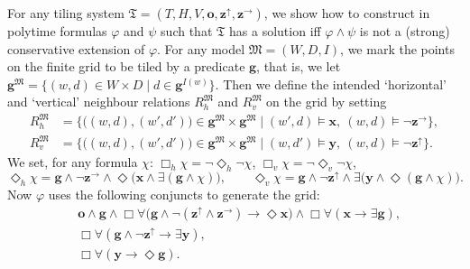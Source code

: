 \documentclass{lmcs} %
\theoremstyle{plain}\newtheorem{satz}[thm]{Satz} %
\newcommand{\tiling}{\mathfrak T}
\newcommand{\bbvarup}{\Zvar^\uparrow}
\newcommand{\bbvarright}{\Zvar^\to}
\newcommand{\Dht}[1]{\Diamond_h{#1}}
\newcommand{\Dvt}[1]{\Diamond_v{#1}}
\newcommand{\Bht}[1]{\Box_h{#1}}
\newcommand{\Bvt}[1]{\Box_v{#1}}
\newcommand{\fform}[1]{\boldsymbol{#1}}
\newcommand{\gvar}{\fform{g}}
\newcommand{\tvar}{\fform{t}}
\newcommand{\xvar}{\fform{x}}
\newcommand{\yvar}{\fform{y}}
\newcommand{\ovar}{\fform{o}}
\newcommand{\Zvar}{\fform{z}}
\newcommand{\Bv}{\forall}
\newcommand{\Bh}{\Box}
\newcommand{\Dv}{\exists}
\newcommand{\Dh}{\Diamond}
\begin{document}
For any tiling system $\tiling=(T,H,V,\ovar,\bbvarup,\bbvarright)$,
we show how to construct in polytime formulas $\varphi$ and $\psi$
such that $\tiling$ has a solution iff $\varphi \wedge \psi$ is not a (strong) conservative extension of $\varphi$. 
%
For any model $\mathfrak{M}=(W,D,I)$, we mark the points on the finite grid to be tiled by a predicate $\gvar$, that is,
we let
%
$
\gvar^{\mathfrak M}=\{(w,d)\in W\times D\mid d\in\gvar^{I(w)}\}.
$
%
Then we define 
%
the intended `horizontal' and `vertical' neighbour relations $R_{h}^{\mathfrak{M}}$ and $R_{v}^{\mathfrak{M}}$ on the grid by setting
%
\begin{align}\label{hrel}
	R_{h}^{\mathfrak{M}} & = \bigl\{\bigl((w,d),(w',d')\bigr) \in \gvar^{\mathfrak{M}}\times \gvar^{\mathfrak{M}} \mid  (w',d) \models \xvar,\ (w,d)\models \neg \bbvarright \bigr\}, \\
	\label{vrel}	
	R_{v}^{\mathfrak{M}} & = \bigl\{\bigl((w,d),(w',d')\bigr) \in \gvar^{\mathfrak{M}}\times \gvar^{\mathfrak{M}} \mid  (w,d') \models \yvar,\ (w,d)\models \neg \bbvarup\bigr\}.
\end{align}
%
We set, for any formula $\chi$: $\Bht{\chi} = \neg \Dht{\neg \chi}$, $\Bvt{\chi}=\neg \Dvt{\neg \chi}$, 
%
\[
\Dht{\chi} = \gvar \land \neg \bbvarright \land \Dh\bigl(\xvar \wedge \Dv (\gvar \wedge \chi)\bigr),\qquad
\Dvt{\chi}  = \gvar \land \neg \bbvarup\land \Dv\bigl(\yvar \wedge \Dh (\gvar \wedge \chi)\bigr).
\]
%
%
Now $\varphi$ uses the following conjuncts to generate the grid: 
%
\begin{align}
	\nonumber
	& \ovar \land \gvar
	 \land \Bh\Bv \bigl(\gvar \wedge \neg (\bbvarup \wedge \bbvarright) \rightarrow \Dh \xvar\bigr)
	 \land \Bh\Bv (\xvar \rightarrow \Dv \gvar),\\
 		\label{hedge1}	
	& \Bh\Bv (\gvar \wedge \neg \bbvarup \rightarrow \Dv \yvar),\\
	\label{hedge2}		
	& \Bh\Bv (\yvar \rightarrow \Dh \gvar).
\end{align}
\end{document}
